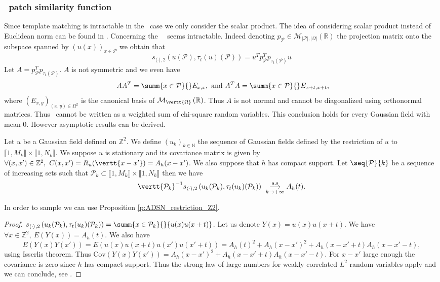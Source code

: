 \subsubsection{\sps \ patch similarity function} Since template matching is intractable
in the  \ case we only consider the scalar product. The idea of considering scalar product
instead of Euclidean norm can be found in \cite{riot2017correlation}. Concerning the
\internalmatching \ \sps \ seems intractable. Indeed denoting
$p_{\mathcal{P}} \in \mathcal{M}_{\vert \mathcal{P} \vert, \vert \Omega
  \vert}\left( \mathbb{R} \right)$ the projection matrix onto the subspace
spanned by $(u(x))_{x\in \mathcal{P}}$ we obtain that
\[s_{\langle \cdot \rangle, 2}\left(u(\mathcal{P}),
    \tau_t(u)(\mathcal{P})\right) = u^T p_{\mathcal{P}}^T
  p_{\tau_t(\mathcal{P})} u\] Let
$A = p_{\mathcal{P}}^T p_{\tau_t(\mathcal{P})}$. $A$ is not symmetric and we
even have
\[ \ AA^T = \summ{x \in \mathcal{P}}{}E_{x,x}, \ \text{and} \ A^TA = \summ{x \in \mathcal{P}}{}E_{x+t,x+t},\]
where $(E_{x,y})_{(x,y) \in \Omega^2}$ is the canonical basis of $\mathcal{M}_{\vertt{\Omega}}\left(\mathbb{R}\right)$.
Thus $A$ is not normal and cannot be diagonalized using orthonormal
matrices. Thus \sps \ cannot be written as a weighted sum of chi-square random
variables. This conclusion holds for every Gaussian field with mean $0$. However
asymptotic results can be derived.
\begin{prop}
  Let $u$ be a Gaussian field defined on $\mathbb{Z}^2$. We define
  $\left(u_k\right)_{k \in \mathbb{N}}$ the sequence of Gaussian fields
  defined by the restriction of $u$ to $\llbracket 1,M_k \rrbracket \times \llbracket 1,N_k \rrbracket$. We suppose $u$ is
  stationary and its covariance matrix is given by
  $\forall (x,x') \in \mathbb{Z}^2, \ C(x,x') = R_u(\vertt{x-x'}) =
  A_h(x-x')$. We also suppose that $h$ has compact support. Let
  $\seq{\mathcal{P}}{k}$ be a sequence of increasing sets such that
  $\mathcal{P}_k \subset \llbracket 1,M_k \rrbracket \times \llbracket 1,N_k \rrbracket$ then we have
  \[\vertt{\mathcal{P}_k}^{-1} s_{\langle \cdot
      \rangle,2}\left(u_k(\mathcal{P}_k),
      \tau_t(u_k)(\mathcal{P}_k) \right) \ \underset{k
      \rightarrow +\infty}{\overset{\text{a.s}}{\longrightarrow}} A_h(t).\]\label{p:sps_internal_as}
\end{prop}
In order to sample we can use Proposition \ref{p:ADSN_restriction_Z2}.
\begin{proof}
  $s_{\langle \cdot \rangle,2}\left(u_k(\mathcal{P}_k),
    \tau_t(u_k)(\mathcal{P}_k) \right) = \summ{x \in
    \mathcal{P}_k}{}{u(x)u(x+t)}$. Let us denote $Y(x) = u(x)u(x+t)$. We have
  $\forall x \in \mathbb{Z}^2, \ E(Y(x)) = A_h(t)$. We also have
  \[E(Y(x)Y(x')) = E(u(x)u(x+t)u(x')u(x'+t)) = A_h(t)^2 + A_h(x-x')^2 +
    A_h(x-x'+t)A_h(x-x'-t),\] using Isserlis theorem. Thus
  $\text{Cov}(Y(x)Y(x')) = A_h(x-x')^2 + A_h(x-x'+t)A_h(x-x'-t)$. For $x-x'$
  large enough the covariance is zero since $h$ has compact support.  Thus the
  strong law of large numbers for weakly correlated $L^2$ random variables apply
  and we can conclude, see \cite{bernstein1927extension}.
\end{proof}

